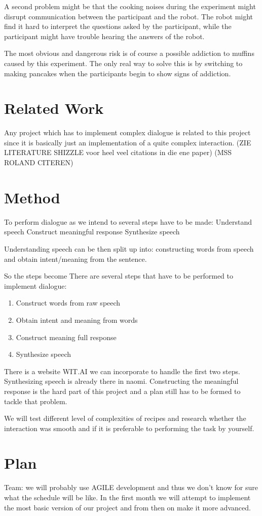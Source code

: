 \documentclass[11pt]{article} %
\begin{document}
A second problem might be that the cooking noises during the experiment might disrupt communication between the participant and the robot. The robot might find it hard to interpret the questions asked by the participant, while the participant might have trouble hearing the answers of the robot.

The most obvious and dangerous risk is of course a possible addiction to muffins caused by this experiment. The only real way to solve this is by switching to making pancakes when the participants begin to show signs of addiction.


\section{Related Work}
Any project which has to implement complex dialogue is related to this project since it is basically just an implementation of a quite complex interaction. (ZIE LITERATURE SHIZZLE voor heel veel citations in die ene paper) (MSS ROLAND CITEREN)

\section{Method}
To perform dialogue as we intend to several steps have to be made:
Understand speech
Construct meaningful response
Synthesize speech

Understanding speech can be then split up into: constructing words from speech and obtain intent/meaning from the sentence.

So the steps become
There are several steps that have to be performed to implement dialogue:
\begin{enumerate}
\item Construct words from raw speech
\item Obtain intent and meaning from words
\item Construct meaning full response
\item Synthesize speech
\end{enumerate}

There is a website WIT.AI we can incorporate to handle the first two steps. Synthesizing speech is already there in naomi. Constructing the meaningful response is the hard part of this project and a plan still has to be formed to tackle that problem.

We will test different level of complexities of recipes and research whether the interaction was smooth and if it is preferable to performing the task by yourself.

\section{Plan}
Team: we will probably use AGILE development and thus we don't know for sure what the schedule will be like. In the first month we will attempt to implement the most basic version of our project and from then on make it more advanced.
\end{document}
